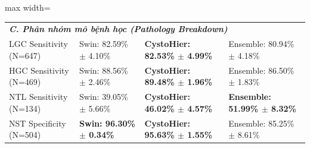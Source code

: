 \begin{table}[t]
\begin{adjustbox}{max width=\textwidth}
\begin{tabular}{lcccccc}
\midrule
\multicolumn{7}{l}{\textit{\textbf{C. Phân nhóm mô bệnh học (Pathology Breakdown)}}} \\
\quad LGC Sensitivity (N=647) & \multicolumn{2}{l}{Swin: 82.59\% $\pm$ 4.10\%} & \multicolumn{2}{l}{\textbf{CystoHier: 82.53\% $\pm$ 4.99\%}} & \multicolumn{2}{l}{Ensemble: 80.94\% $\pm$ 4.18\%} \\
\quad HGC Sensitivity (N=469) & \multicolumn{2}{l}{Swin: 88.56\% $\pm$ 2.46\%} & \multicolumn{2}{l}{\textbf{CystoHier: 89.48\% $\pm$ 1.96\%}} & \multicolumn{2}{l}{Ensemble: 86.50\% $\pm$ 1.83\%} \\
\quad NTL Sensitivity (N=134) & \multicolumn{2}{l}{Swin: 39.05\% $\pm$ 5.66\%} & \multicolumn{2}{l}{\textbf{CystoHier: 46.02\% $\pm$ 4.57\%}} & \multicolumn{2}{l}{\textbf{Ensemble: 51.99\% $\pm$ 8.32\%}} \\
\quad NST Specificity (N=504) & \multicolumn{2}{l}{\textbf{Swin: 96.30\% $\pm$ 0.34\%}} & \multicolumn{2}{l}{\textbf{CystoHier: 95.63\% $\pm$ 1.55\%}} & \multicolumn{2}{l}{Ensemble: 85.25\% $\pm$ 8.61\%} \\
\bottomrule
\end{tabular}
\end{adjustbox}
\end{table}
